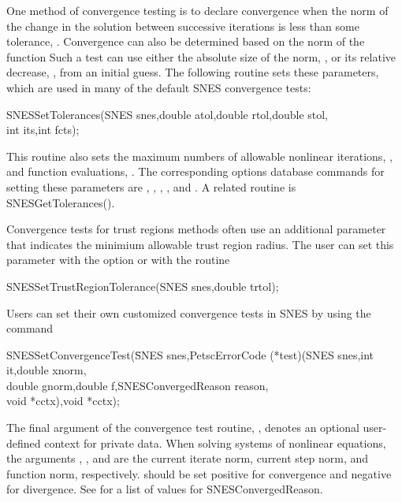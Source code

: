 One method of convergence testing is
to declare convergence when the norm of the change in the solution
between successive iterations is less than some tolerance, .
Convergence can also be determined based on the norm of the function
Such a test can use either the absolute size of the
norm, , or its relative decrease, , from an initial
guess.  The following routine sets these parameters, which are used
in many of the default SNES convergence tests: 
\begin{tabbing}
  SNESSetTolerances(SNES snes,double atol,double rtol,double stol,\\
          int its,int fcts);
\end{tabbing}
This routine also sets the maximum numbers of allowable
nonlinear iterations, , and function evaluations, .
The corresponding options database commands for setting these parameters
are , , ,
   
 
, and .
A related routine is SNESGetTolerances(). 

Convergence tests for trust regions methods often use an additional
parameter that indicates the minimium allowable trust region radius.
The user can set this parameter with the option 
 or with the routine
\begin{tabbing}
  SNESSetTrustRegionTolerance(SNES snes,double trtol);
\end{tabbing}

Users can set their own customized convergence tests in SNES by using
the command 
\begin{tabbing}
  SNESSetConvergenceTest(\=SNES snes,PetscErrorCode (*test)(SNES snes,int it,double xnorm,\\
                         \>double gnorm,double f,SNESConvergedReason reason,\\
                         \>void *cctx),void *cctx);
\end{tabbing}
The final argument of the convergence test routine, ,
denotes an optional user-defined context for private data.  When
solving systems of nonlinear equations, the arguments ,
, and  are the current iterate norm, current step
norm, and function norm, respectively. 
 should be set positive
for convergence and negative for divergence. See 
for a list of values for SNESConvergedReason. 

